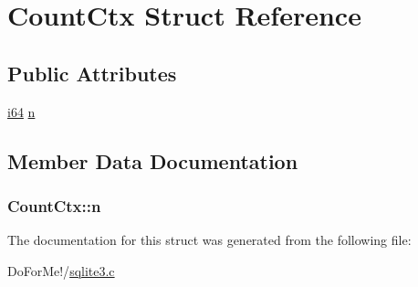\hypertarget{struct_count_ctx}{\section{Count\-Ctx Struct Reference}
\label{struct_count_ctx}
}
\subsection*{Public Attributes}
\begin{DoxyCompactItemize}
\item 
\hyperlink{sqlite3_8c_a2a0f0f4ae7001eb54351f77ea1cdbcfd}{i64} \hyperlink{struct_count_ctx_a141c718918dbfaa183f772bfd7a516f4}{n}
\end{DoxyCompactItemize}


\subsection{Member Data Documentation}
\hypertarget{struct_count_ctx_a141c718918dbfaa183f772bfd7a516f4}{
\subsubsection[{n}]{ Count\-Ctx\-::n}}\label{struct_count_ctx_a141c718918dbfaa183f772bfd7a516f4}


The documentation for this struct was generated from the following file\-:\begin{DoxyCompactItemize}
\item 
Do\-For\-Me!/\hyperlink{sqlite3_8c}{sqlite3.\-c}\end{DoxyCompactItemize}
